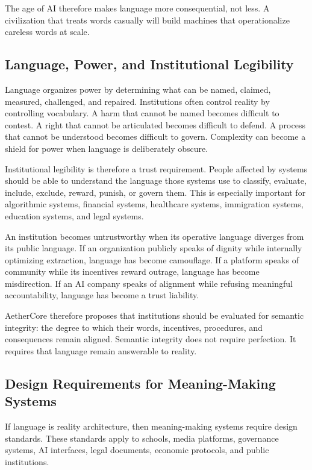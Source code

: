 \documentclass[12pt]{article}
\begin{document}
The age of AI therefore makes language more consequential, not less. A civilization that treats words casually will build machines that operationalize careless words at scale.

\subsection{Language, Power, and Institutional Legibility}

Language organizes power by determining what can be named, claimed, measured, challenged, and repaired. Institutions often control reality by controlling vocabulary. A harm that cannot be named becomes difficult to contest. A right that cannot be articulated becomes difficult to defend. A process that cannot be understood becomes difficult to govern. Complexity can become a shield for power when language is deliberately obscure.

Institutional legibility is therefore a trust requirement. People affected by systems should be able to understand the language those systems use to classify, evaluate, include, exclude, reward, punish, or govern them. This is especially important for algorithmic systems, financial systems, healthcare systems, immigration systems, education systems, and legal systems.

An institution becomes untrustworthy when its operative language diverges from its public language. If an organization publicly speaks of dignity while internally optimizing extraction, language has become camouflage. If a platform speaks of community while its incentives reward outrage, language has become misdirection. If an AI company speaks of alignment while refusing meaningful accountability, language has become a trust liability.

AetherCore therefore proposes that institutions should be evaluated for semantic integrity: the degree to which their words, incentives, procedures, and consequences remain aligned. Semantic integrity does not require perfection. It requires that language remain answerable to reality.

\subsection{Design Requirements for Meaning-Making Systems}

If language is reality architecture, then meaning-making systems require design standards. These standards apply to schools, media platforms, governance systems, AI interfaces, legal documents, economic protocols, and public institutions.
\end{document}
